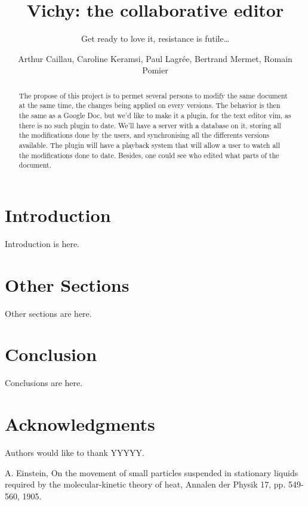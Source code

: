 \documentclass{llncs}
\begin{document}
\title{Vichy: the collaborative editor}
\subtitle{Get ready to love it, resistance is futile\ldots}

\author{Arthur Caillau, Caroline Keramsi, Paul Lagrée, Bertrand Mermet, Romain Pomier}

\maketitle

\begin{abstract}

The propose of this project is to permet several persons to modify the same document at the same time, the changes being applied on every versions. The behavior is then the same as a Google Doc, but we'd like to make it a plugin, for the text editor vim, as there is no such plugin to date.  We'll have a server with a database on it,
storing all the modifications done by the users, and synchronising all the differents versions available. The plugin will have a playback system that will allow a user to watch all the modifications done to date. Besides, one could see who edited what parts of the document.

\end{abstract}

\section{Introduction}\label{sec:Introduction}

Introduction is here.

\section{Other Sections}\label{sec:Others}

Other sections are here. 


\section{Conclusion}\label{sec:Conclusion}

Conclusions are here.

\section*{Acknowledgments}\label{sec:Acknowledgments}

Authors would like to thank YYYYY.

\begin{thebibliography}{1}

A. Einstein, On the movement of small particles suspended in stationary liquids required by the molecular-kinetic theory of heat, Annalen der Physik 17, pp. 549-560, 1905.

\end{thebibliography}
\end{document}
